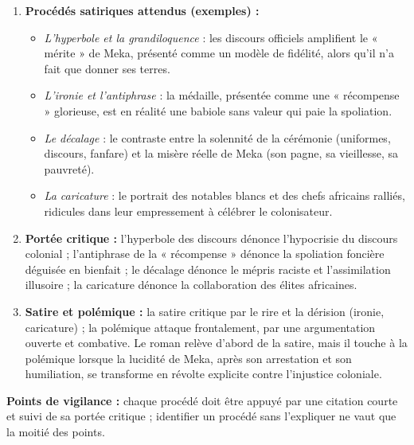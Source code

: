 \documentclass[11pt]{article}
\newcommand{\cle}[1]{{\popxbold\color{popdark}#1}}
\begin{document}
\begin{corrige}
\begin{enumerate}
\item \textbf{Procédés satiriques attendus (exemples) :}
\begin{itemize}
\item \emph{L'hyperbole et la grandiloquence} : les discours officiels amplifient le « mérite » de Meka, présenté comme un modèle de fidélité, alors qu'il n'a fait que donner ses terres.
\item \emph{L'ironie et l'antiphrase} : la médaille, présentée comme une « récompense » glorieuse, est en réalité une babiole sans valeur qui paie la spoliation.
\item \emph{Le décalage} : le contraste entre la solennité de la cérémonie (uniformes, discours, fanfare) et la misère réelle de Meka (son pagne, sa vieillesse, sa pauvreté).
\item \emph{La caricature} : le portrait des notables blancs et des chefs africains ralliés, ridicules dans leur empressement à célébrer le colonisateur.
\end{itemize}
\item \textbf{Portée critique :} l'hyperbole des discours dénonce l'hypocrisie du discours colonial ; l'antiphrase de la « récompense » dénonce la spoliation foncière déguisée en bienfait ; le décalage dénonce le mépris raciste et l'assimilation illusoire ; la caricature dénonce la collaboration des élites africaines.
\item \textbf{Satire et polémique :} la \cle{satire} critique par le rire et la dérision (ironie, caricature) ; la \cle{polémique} attaque frontalement, par une argumentation ouverte et combative. Le roman relève d'abord de la satire, mais il touche à la polémique lorsque la lucidité de Meka, après son arrestation et son humiliation, se transforme en révolte explicite contre l'injustice coloniale.
\end{enumerate}
\textbf{Points de vigilance :} chaque procédé doit être appuyé par une citation courte et suivi de sa portée critique ; identifier un procédé sans l'expliquer ne vaut que la moitié des points.
\end{corrige}
\end{document}
